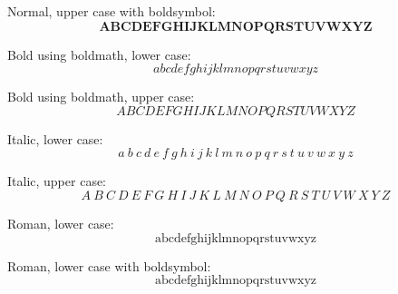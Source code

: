 \documentclass[12pt,a4paper]{article}
\theoremstyle{clearprint}
\begin{document}
\noindent 
Normal, upper case with boldsymbol:
\begin{equation}
\boldsymbol{A  B  C  D  E  F  G  H  I  J  K  L  M  N  O  P  Q  R  S  T  U  V  W  X  Y  Z} 
\end{equation}

\noindent 
Bold using boldmath, lower case:\boldmath
\begin{equation}
a  b  c  d  e  f  g  h  i  j  k  l  m  n  o  p  q  r  s  t  u  v  w  x  y  z
\end{equation}\unboldmath

\noindent 
Bold using boldmath, upper case:\boldmath
\begin{equation}
A  B  C  D  E  F  G  H  I  J  K  L  M  N  O  P  Q  R  S  T  U  V  W  X  Y  Z  
\end{equation}\unboldmath

\noindent
Italic, lower case:
\begin{equation}
\mathit{a}~\mathit{b}~\mathit{c}~\mathit{d}~\mathit{e}~\mathit{f}~\mathit{g}~\mathit{h}~\mathit{i}~\mathit{j}~\mathit{k}~\mathit{l}~\mathit{m}~\mathit{n}~\mathit{o}~\mathit{p}~\mathit{q}~\mathit{r}~\mathit{s}~\mathit{t}~\mathit{u}~\mathit{v}~\mathit{w}~\mathit{x}~\mathit{y}~\mathit{z}
\end{equation}

\noindent
Italic, upper case:
\begin{equation}
\mathit{A}~\mathit{B}~\mathit{C}~\mathit{D}~\mathit{E}~\mathit{F}~\mathit{G}~\mathit{H}~\mathit{I}~\mathit{J}~\mathit{K}~\mathit{L}~\mathit{M}~\mathit{N}~\mathit{O}~\mathit{P}~\mathit{Q}~\mathit{R}~\mathit{S}~\mathit{T}~\mathit{U}~\mathit{V}~\mathit{W}~\mathit{X}~\mathit{Y}~\mathit{Z}
\end{equation}

\noindent 
Roman, lower case:
\begin{equation}
\mathrm{a}  \mathrm{b}  \mathrm{c}  \mathrm{d}  \mathrm{e}  \mathrm{f}  \mathrm{g}  \mathrm{h}  \mathrm{i}  \mathrm{j}  \mathrm{k}  \mathrm{l}  \mathrm{m}  \mathrm{n}  \mathrm{o}  \mathrm{p}  \mathrm{q}  \mathrm{r}  \mathrm{s}  \mathrm{t}  \mathrm{u}  \mathrm{v}  \mathrm{w}  \mathrm{x}  \mathrm{y}  \mathrm{z}
\end{equation}

\noindent 
Roman, lower case with boldsymbol:
\begin{equation}
\boldsymbol{\mathrm{a}  \mathrm{b}  \mathrm{c}  \mathrm{d}  \mathrm{e}  \mathrm{f}  \mathrm{g}  \mathrm{h}  \mathrm{i}  \mathrm{j}  \mathrm{k}  \mathrm{l}  \mathrm{m}  \mathrm{n}  \mathrm{o}  \mathrm{p}  \mathrm{q}  \mathrm{r}  \mathrm{s}  \mathrm{t}  \mathrm{u}  \mathrm{v}  \mathrm{w}  \mathrm{x}  \mathrm{y}  \mathrm{z}}
\end{equation}
\end{document}
